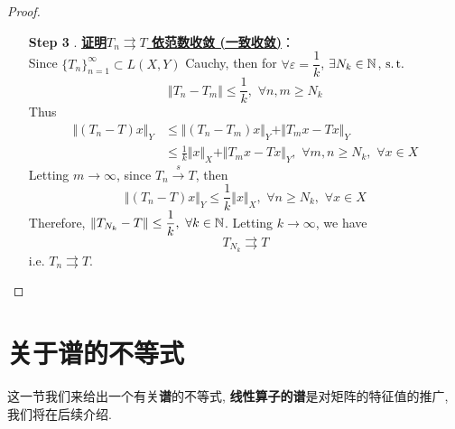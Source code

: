 \begin{thm}
\begin{proof}
\begin{enumerate}
				\vspace*{10em}
				
				\item[\textbf{Step 3}]. \underline{\textbf{证明$T_n \rightrightarrows T$ 依范数收敛 (一致收敛)}}：\\
				Since $\{ T_n \}_{n = 1}^{\infty} \subset L(X , Y)$ Cauchy, then for $\forall \varepsilon = \dfrac{1}{k}$, $\exists N_{k} \in \mathbb{N}$, $\operatorname{s.t.}$
				\[ \Vert T_n - T_m \Vert \leq \frac{1}{k} , \,\, \forall n , m \geq N_k \]
				Thus
				\begin{align*}
					\Vert (T_n - T) x \Vert_Y 
					&\leq \Vert (T_n - T_m) x \Vert_Y + \Vert T_m x - Tx \Vert_Y \\
					&\leq \frac{1}{k} \Vert x \Vert_X + \Vert T_m x - Tx \Vert_Y , \,\, \forall m , n \geq N_k , \,\, \forall x \in X
				\end{align*}
				Letting $m \to \infty$, since $T_n \overset{s}{\to} T$, then
				\[ \Vert (T_n - T) x \Vert_Y \leq \frac{1}{k} \Vert x \Vert_X , \,\, \forall n \geq N_k , \,\, \forall x \in X \]
				Therefore, $\Vert T_{N_k} - T \Vert \leq \dfrac{1}{k} , \,\, \forall k \in \mathbb{N}$. Letting $k \to \infty$, we have
				\[ T_{N_k} \rightrightarrows T \]
				i.e. $T_n \rightrightarrows T$. 
			\end{enumerate}
		\end{proof}
	\end{thm}

\newpage

\section{关于谱的不等式}
	这一节我们来给出一个有关\textbf{谱}的不等式, \textbf{线性算子的谱}是对矩阵的特征值的推广, 我们将在后续介绍. 
	
	\vspace*{2em}
	
